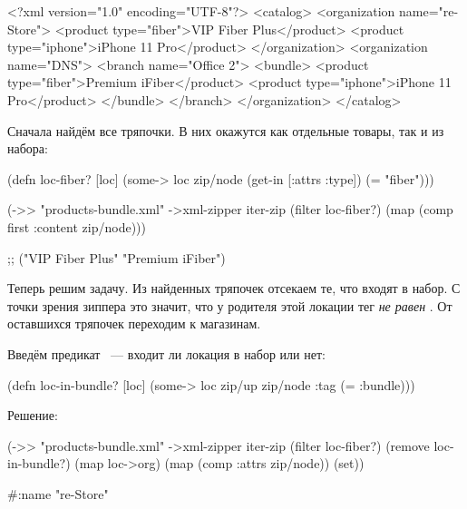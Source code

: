 \begin{english}
  \begin{xml/lines}
<?xml version="1.0" encoding="UTF-8"?>
<catalog>
  <organization name="re-Store">
    <product type="fiber">VIP Fiber Plus</product>
    <product type="iphone">iPhone 11 Pro</product>
  </organization>
  <organization name="DNS">
    <branch name="Office 2">
      <bundle>
        <product type="fiber">Premium iFiber</product>
        <product type="iphone">iPhone 11 Pro</product>
      </bundle>
    </branch>
  </organization>
</catalog>
  \end{xml/lines}
\end{english}

Сначала найдём все тряпочки. В них окажутся как отдельные товары, так и из
набора:

\begin{english}
  \begin{clojure}
(defn loc-fiber? [loc]
  (some-> loc
          zip/node
          (get-in [:attrs :type])
          (= "fiber")))

(->> "products-bundle.xml"
     ->xml-zipper
     iter-zip
     (filter loc-fiber?)
     (map (comp first :content zip/node)))

;; ("VIP Fiber Plus" "Premium iFiber")
  \end{clojure}
\end{english}

Теперь решим задачу. Из найденных тряпочек отсекаем те, что входят в набор. С
точки зрения зиппера это значит, что у родителя этой локации тег \emph{не равен}
. От оставшихся тряпочек переходим к магазинам.

Введём предикат ~--- входит ли локация в набор или нет:

\begin{english}
  \begin{clojure}
(defn loc-in-bundle?
  [loc]
  (some-> loc
          zip/up
          zip/node
          :tag
          (= :bundle)))
  \end{clojure}
\end{english}

Решение:

\begin{english}
  \begin{clojure}
(->> "products-bundle.xml"
     ->xml-zipper
     iter-zip
     (filter loc-fiber?)
     (remove loc-in-bundle?)
     (map loc->org)
     (map (comp :attrs zip/node))
     (set))

#{{:name "re-Store"}}
  \end{clojure}
\end{english}

